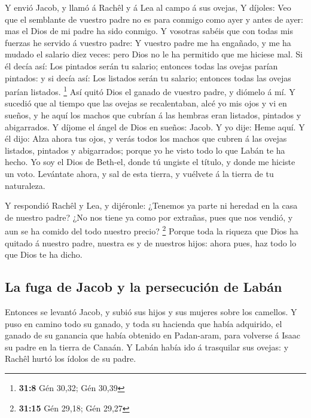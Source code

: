  Y envió Jacob, y llamó á Rachêl y á Lea al campo á sus
ovejas,  Y díjoles: Veo que el semblante de vuestro padre
no es para conmigo como ayer y antes de ayer: mas el Dios de mi padre ha
sido conmigo.  Y vosotras sabéis que con todas mis fuerzas
he servido á vuestro padre:  Y vuestro padre me ha
engañado, y me ha mudado el salario diez veces: pero Dios no le ha
permitido que me hiciese mal.  Si él decía así: Los
pintados serán tu salario; entonces todas las ovejas parían pintados: y
si decía así: Los listados serán tu salario; entonces todas las ovejas
parían listados. \footnote{\textbf{31:8} Gén 30,32; Gén 30,39}
 Así quitó Dios el ganado de vuestro padre, y diómelo á
mí.  Y sucedió que al tiempo que las ovejas se
recalentaban, alcé yo mis ojos y vi en sueños, y he aquí los machos que
cubrían á las hembras eran listados, pintados y abigarrados.
 Y díjome el ángel de Dios en sueños: Jacob. Y yo dije:
Heme aquí.  Y él dijo: Alza ahora tus ojos, y verás todos
los machos que cubren á las ovejas listados, pintados y abigarrados;
porque yo he visto todo lo que Labán te ha hecho.  Yo soy
el Dios de Beth-el, donde tú ungiste el título, y donde me hiciste un
voto. Levántate ahora, y sal de esta tierra, y vuélvete á la tierra de
tu naturaleza.

 Y respondió Rachêl y Lea, y dijéronle: ¿Tenemos ya parte
ni heredad en la casa de nuestro padre?  ¿No nos tiene ya
como por extrañas, pues que nos vendió, y aun se ha comido del todo
nuestro precio? \footnote{\textbf{31:15} Gén 29,18; Gén 29,27}
 Porque toda la riqueza que Dios ha quitado á nuestro
padre, nuestra es y de nuestros hijos: ahora pues, haz todo lo que Dios
te ha dicho.

\hypertarget{la-fuga-de-jacob-y-la-persecuciuxf3n-de-labuxe1n}{%
\subsection{La fuga de Jacob y la persecución de
Labán}\label{la-fuga-de-jacob-y-la-persecuciuxf3n-de-labuxe1n}}

 Entonces se levantó Jacob, y subió sus hijos y sus
mujeres sobre los camellos.  Y puso en camino todo su
ganado, y toda su hacienda que había adquirido, el ganado de su ganancia
que había obtenido en Padan-aram, para volverse á Isaac su padre en la
tierra de Canaán.  Y Labán había ido á trasquilar sus
ovejas: y Rachêl hurtó los ídolos de su padre.

